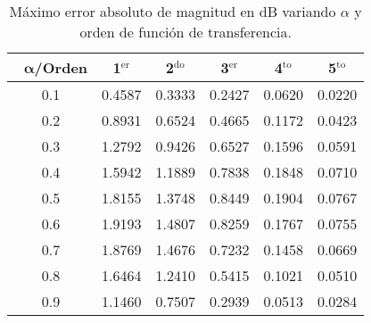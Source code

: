 \begin{table}[!hbp]                                 
\centering            
\caption{Máximo error absoluto de magnitud en dB variando $\alpha$ y orden de función de transferencia.}                           
\label{tab:max_error_mag}                               
\begin{tabular}{cccccc}
\hline                                             
$\,\,\,\,\bm{\alpha}$\textbf{/Orden} & \textbf{1$^{\mathrm{er}}$} & \textbf{2$^{\mathrm{do}}$} & \textbf{3$^{\mathrm{er}}$} & \textbf{4$^{\mathrm{to}}$} & \textbf{5$^{\mathrm{to}}$} \\                     
\hline                                             
0.1 & 0.4587 & 0.3333 & 0.2427 & 0.0620 & 0.0220 \\
                                           
0.2 & 0.8931 & 0.6524 & 0.4665 & 0.1172 & 0.0423 \\
                                            
0.3 & 1.2792 & 0.9426 & 0.6527 & 0.1596 & 0.0591 \\
                                            
0.4 & 1.5942 & 1.1889 & 0.7838 & 0.1848 & 0.0710 \\
                                            
0.5 & 1.8155 & 1.3748 & 0.8449 & 0.1904 & 0.0767 \\
                                           
0.6 & 1.9193 & 1.4807 & 0.8259 & 0.1767 & 0.0755 \\
                                            
0.7 & 1.8769 & 1.4676 & 0.7232 & 0.1458 & 0.0669 \\
                                            
0.8 & 1.6464 & 1.2410 & 0.5415 & 0.1021 & 0.0510 \\
                                           
0.9 & 1.1460 & 0.7507 & 0.2939 & 0.0513 & 0.0284 \\
\hline                                             
\end{tabular}                                                             
\end{table}


